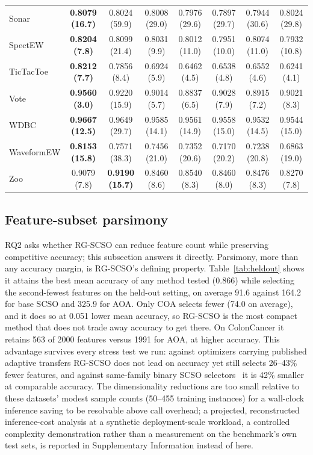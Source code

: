 \documentclass[preprint,3p,times]{elsarticle}
\begin{document}
\begin{table}[!tbp]
\begin{tabular}{lccccccc}
Sonar & \textbf{0.8079 (16.7)} & 0.8024 (59.9) & 0.8008 (29.0) & 0.7976 (29.6) & 0.7897 (29.7) & 0.7944 (30.6) & 0.8024 (29.8) \\
SpectEW & \textbf{0.8204 (7.8)} & 0.8099 (21.4) & 0.8031 (9.9) & 0.8012 (11.0) & 0.7951 (10.0) & 0.8074 (11.0) & 0.7932 (10.8) \\
TicTacToe & \textbf{0.8212 (7.7)} & 0.7856 (8.4) & 0.6924 (5.9) & 0.6462 (4.5) & 0.6538 (4.8) & 0.6552 (4.6) & 0.6241 (4.1) \\
Vote & \textbf{0.9560 (3.0)} & 0.9220 (15.9) & 0.9014 (5.7) & 0.8837 (6.5) & 0.9028 (7.9) & 0.8915 (7.2) & 0.9021 (8.3) \\
WDBC & \textbf{0.9667 (12.5)} & 0.9649 (29.7) & 0.9585 (14.1) & 0.9561 (14.9) & 0.9558 (15.0) & 0.9532 (14.5) & 0.9544 (15.0) \\
WaveformEW & \textbf{0.8153 (15.8)} & 0.7571 (38.3) & 0.7456 (21.0) & 0.7352 (20.6) & 0.7170 (20.2) & 0.7238 (20.8) & 0.6863 (19.0) \\
Zoo & 0.9079 (7.8) & \textbf{0.9190 (15.7)} & 0.8460 (8.6) & 0.8540 (8.3) & 0.8460 (8.0) & 0.8476 (8.3) & 0.8270 (7.8) \\
\bottomrule
\end{tabular}
\end{table}


\subsection{Feature-subset parsimony}
\label{sec:parsimony}
RQ2 asks whether RG-SCSO can reduce feature count while preserving
competitive accuracy; this subsection answers it directly. Parsimony, more
than any accuracy margin, is RG-SCSO's defining property.
Table~\ref{tab:heldout} shows it attains the best mean accuracy of any
method tested (0.866) while selecting the
second-fewest features on the held-out setting, on average
91.6 against
164.2 for base SCSO and
325.9 for AOA. Only COA selects fewer
(74.0 on average), and it does so at
0.051 lower
mean accuracy, so RG-SCSO is the most compact method that does not trade
away accuracy to get there. On ColonCancer it retains
563 of 2000 features
versus 1991 for AOA, at higher accuracy.
This advantage survives every stress test we run: against optimizers
carrying published adaptive transfers RG-SCSO does not lead on accuracy yet
still selects 26--43\% fewer
features, and against same-family binary SCSO
selectors~\cite{bscso,scsofs2,scsofs3} it is
42\% smaller at comparable accuracy. The dimensionality reductions are too small relative to these datasets' modest sample counts (50--455 training instances) for a wall-clock inference saving to be resolvable above call overhead; a projected, reconstructed inference-cost analysis at a synthetic deployment-scale workload, a controlled complexity demonstration rather than a measurement on the benchmark's own test sets, is reported in Supplementary Information instead of here.
\end{document}
